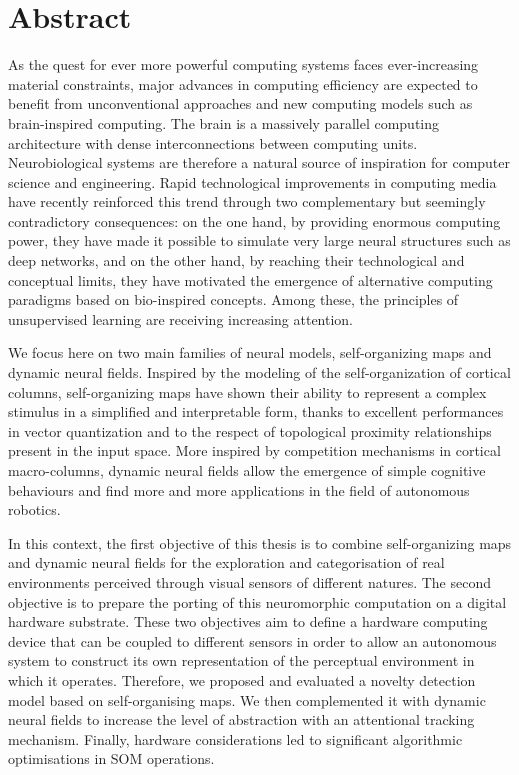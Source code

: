 \chapter*{Abstract}
\markboth{}{}

As the quest for ever more powerful computing systems faces ever-increasing material constraints, major advances in computing efficiency are expected to benefit from unconventional approaches and new computing models such as brain-inspired computing. The brain is a massively parallel computing architecture with dense interconnections between computing units. Neurobiological systems are therefore a natural source of inspiration for computer science and engineering. Rapid technological improvements in computing media have recently reinforced this trend through two complementary but seemingly contradictory consequences: on the one hand, by providing enormous computing power, they have made it possible to simulate very large neural structures such as deep networks, and on the other hand, by reaching their technological and conceptual limits, they have motivated the emergence of alternative computing paradigms based on bio-inspired concepts. Among these, the principles of unsupervised learning are receiving increasing attention.

We focus here on two main families of neural models, self-organizing maps and dynamic neural fields. Inspired by the modeling of the self-organization of cortical columns, self-organizing maps have shown their ability to represent a complex stimulus in a simplified and interpretable form, thanks to excellent performances in vector quantization and to the respect of topological proximity relationships present in the input space. More inspired by competition mechanisms in cortical macro-columns, dynamic neural fields allow the emergence of simple cognitive behaviours and find more and more applications in the field of autonomous robotics.

In this context, the first objective of this thesis is to combine self-organizing maps and dynamic neural fields for the exploration and categorisation of real environments perceived through visual sensors of different natures. The second objective is to prepare the porting of this neuromorphic computation on a digital hardware substrate. These two objectives aim to define a hardware computing device that can be coupled to different sensors in order to allow an autonomous system to construct its own representation of the perceptual environment in which it operates. Therefore, we proposed and evaluated a novelty detection model based on self-organising maps. We then complemented it with dynamic neural fields to increase the level of abstraction with an attentional tracking mechanism. Finally, hardware considerations led to significant algorithmic optimisations in SOM operations.